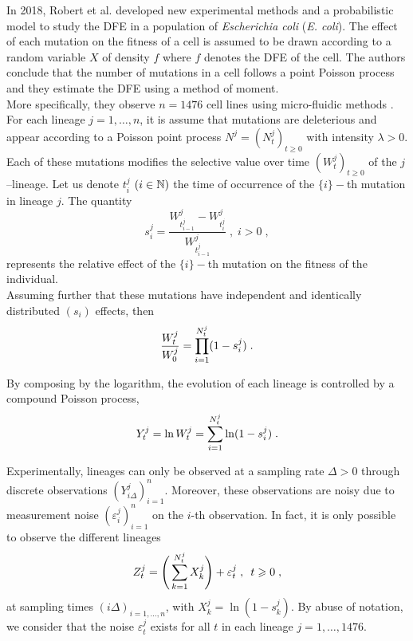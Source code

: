 In 2018, Robert et al. \cite{robert2018mutation} developed new experimental methods and a probabilistic model to study the DFE in a population of \textit{Escherichia coli} (\textit{E. coli}). The effect of each mutation on the fitness of a cell is assumed to be drawn according to a random variable $X$ of density $f$ where $f$ denotes the DFE of the cell. 
The authors conclude that the number of mutations in a cell follows a point Poisson process and they estimate the DFE using a method of moment.\\

More specifically, they observe $n = 1476$ cell lines using micro-fluidic methods \cite{wang2010robust}. For each lineage $j = 1, \ldots, n$, it is assume that mutations are deleterious and appear according to a Poisson point process $N^j = (N_t^j)_{t \geq 0}$ with intensity $\lambda > 0$. Each of these mutations modifies the selective value over time $(W_t^j)_{t\geq0}$ of the $j$--lineage. Let us denote $t_i^j$ $(i \in \mathbb{N})$ the time of occurrence of the $\{i\} - $th mutation in lineage $j$. The quantity
        \begin{equation*}
             s_i^j = \frac{W_{t_{i-1}^j}^j - W_{t_i^j}^j}{W_{t_{i-1}^j}^j} \;,\; 
            i > 0 \; ,
        \end{equation*}
represents the relative effect of the $\{i\} - $th mutation on the fitness of the individual. \\
Assuming further that these mutations have independent and identically distributed $(s_i)$ effects, then
    \begin{equation*}
    \frac{W_t^j}{W_0^j} = \prod_{i = 1}^{N_t^j}(1 - s_i^j) 
    \; .
    \label{eq:mod_stochastique}
    \end{equation*}

By composing by the logarithm, the evolution of each lineage is controlled by a compound Poisson process, \ie
        \begin{equation*}
            Y_t^j = \ln W_t^j = \sum_{i = 1}^{N_t^j} \ln(1 - s_i^j) 
            \; .
        \end{equation*}

Experimentally, lineages can only be observed at a sampling rate $\Delta > 0$ through discrete observations $(Y_{i\Delta}^j)_{i = 1}^n$. 
Moreover, these observations are noisy due to measurement noise $(\varepsilon^j_{i})_{i = 1}^n$ on the $i$-th observation. In fact, it is only possible to observe the different lineages 
    \begin{equation}\label{eq:main_process}
        Z^j_t = \Bigg( \sum^{N_t^j}_{k = 1}X_k^j \Bigg) + \varepsilon^j_t
        \; , \enspace
        t \geqslant 0
        \; ,
    \end{equation}
at sampling times $(i\Delta)_{i = 1,\ldots,n}$, with $X_k^j = \ln(1 - s_k^j)$.  By abuse of notation, we consider that the noise $\varepsilon_t^j$ exists for all $t$ in each lineage $j = 1, \ldots, 1476$. \\

